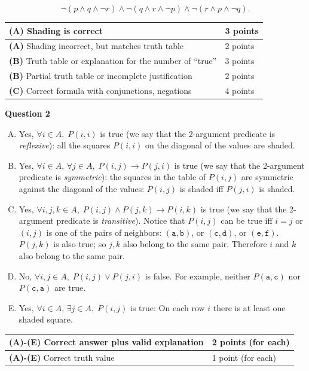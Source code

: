 \documentclass[jou]{apa6}
\begin{document}
$$\neg (p \wedge q \wedge \neg r) \wedge \neg (q \wedge r \wedge \neg p) \wedge \neg (r \wedge p \wedge \neg q).$$

{\footnotesize
\begin{tabular}{|l|l|} \hline
{\bf (A)} Shading is correct & 3 points \\ \hline
{\bf (A)} Shading incorrect, but matches truth table & 2 points \\ \hline
{\bf (B)} Truth table or explanation for the number of ``true'' & 3 points \\ \hline
{\bf (B)} Partial truth table or incomplete justification & 2 points \\ \hline
{\bf (C)} Correct formula with conjunctions, negations & 4 points \\ \hline
\end{tabular}
}




\vspace{10pt}
{\bf Question 2}
\begin{enumerate}[(A)]
\item Yes, $\forall i \in A,\;P(i,i)$ is true (we say that the 2-argument predicate 
is {\em reflexive}): all the squares $P(i,i)$ on the diagonal of the values are shaded. 
\item Yes, $\forall i \in A,\,\forall j \in A,\;P(i,j) \rightarrow P(j,i)$ is true (we say that the 2-argument predicate 
is {\em symmetric}): the squares in the table of $P(i,j)$ are symmetric against
the diagonal of the values: $P(i,j)$ is shaded iff $P(j,i)$ is shaded.
\item Yes, $\forall i,j,k \in A,\;P(i,j) \wedge P(j,k) \rightarrow P(i,k)$ is true 
(we say that the 2-argument predicate 
is {\em transitive}). Notice that $P(i,j)$ can be true iff $i=j$ or $(i,j)$ is 
one of the pairs of neighbors: $(\mathtt{a},\mathtt{b})$, or $(\mathtt{c},\mathtt{d})$, or $(\mathtt{e},\mathtt{f})$.
$P(j,k)$ is also true; so $j,k$ also belong to the same pair. Therefore $i$ and $k$ also belong to the same pair. 
\item No, $\forall i,j \in A,\;P(i,j) \vee P(j,i)$ is false. For example, neither $P(\mathtt{a},\mathtt{c})$
nor $P(\mathtt{c},\mathtt{a})$ are true.
\item Yes, $\forall i \in A,\, \exists j \in A,\;P(i,j)$ is true: On each row $i$ there is at least
one shaded square.
\end{enumerate}

{\footnotesize
\begin{tabular}{|l|l|} \hline
{\bf (A)-(E)} Correct answer plus valid explanation & 2 points (for each) \\ \hline
{\bf (A)-(E)} Correct truth value & 1 point (for each) \\ \hline
\end{tabular}
}
\end{document}
